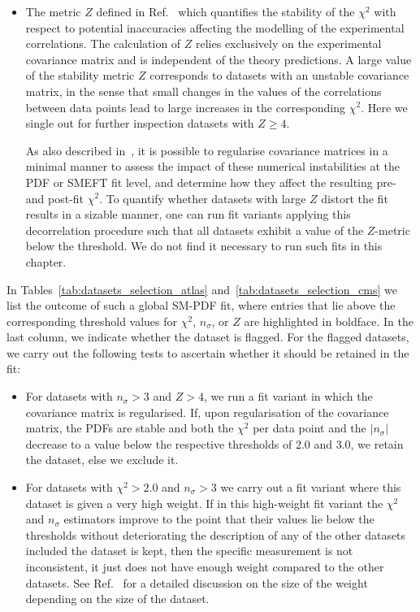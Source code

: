 \documentclass[withindex,glossary]{cam-thesis}
\begin{document}
\begin{itemize}
%
\item The metric $Z$ defined in Ref.~\cite{Kassabov:2022pps} which
quantifies the stability of the $\chi^2$ with respect
to potential inaccuracies affecting the modelling of the experimental correlations.
%
The calculation of $Z$ relies  exclusively on the experimental covariance matrix
and is independent of the theory predictions.
%
A large value of the stability metric $Z$ corresponds to
datasets with an unstable covariance matrix, in the sense that small changes
in the values of the correlations between data points lead to large
increases in the corresponding $\chi^2$.
%
Here we single out for further inspection  datasets with $Z\ge 4$.

As also described in~\cite{Kassabov:2022pps}, it is possible to regularise
covariance matrices in a minimal manner to assess the impact of these numerical
instabilities at the PDF or SMEFT fit level, and determine how
they affect the resulting pre- and post-fit $\chi^2$.
%
To quantify whether datasets with large $Z$ distort the fit results in a sizable
manner, one can run fit variants applying this decorrelation procedure such that all datasets
exhibit a value of the $Z$-metric below the threshold. We do not find it necessary
to run such fits in this chapter.

\end{itemize}

\noindent
In  Tables~\ref{tab:datasets_selection_atlas} and~\ref{tab:datasets_selection_cms}
we list the outcome of such a global SM-PDF fit, where entries that lie above the corresponding threshold values for $\chi^2$, $n_{\sigma}$, or $Z$ are highlighted in boldface.
%
In the last column, we indicate whether the dataset is flagged.
%
For the flagged datasets, we carry out the following tests to ascertain whether
it should be retained in the fit:

\begin{itemize}

\item For datasets with  $n_\sigma> 3$ and $Z>4$,  we run a fit variant in which the covariance matrix is regularised.
%
  If, upon regularisation of the covariance matrix, the PDFs are
  stable and both the $\chi^2$ per data point and the $|n_\sigma|$ decrease to a value below the
  respective thresholds of 2.0 and 3.0, we retain the dataset, else we exclude it.

\item For datasets with $\chi^2>2.0$ and $n_\sigma>3$ we carry out a fit variant
  where this dataset is given a very high weight.
  If in this high-weight fit variant the $\chi^2$ and $n_\sigma$ estimators
  improve to the point that their values lie below the thresholds  without
  deteriorating the description of any of the other datasets included
  the dataset is kept, then the specific measurement is not
  inconsistent, it just does not have enough weight compared to the
  other datasets. See Ref.~\cite{NNPDF:2021njg} for a detailed
  discussion on the size of the weight depending on the size of the
  dataset. 
\end{itemize}
\end{document}
